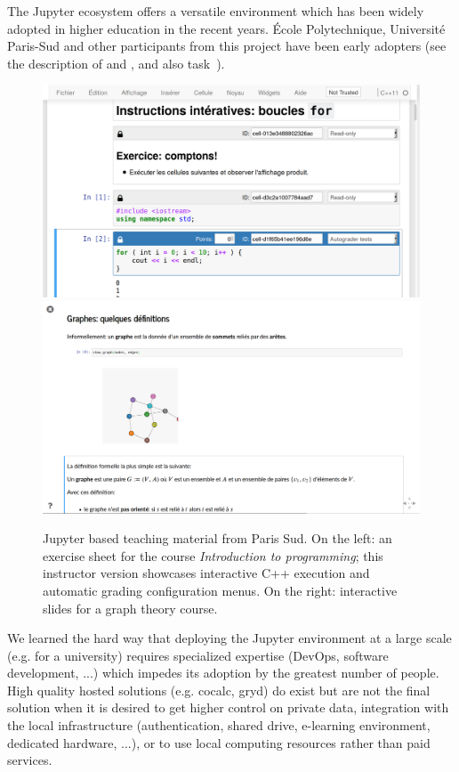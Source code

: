   The Jupyter
  ecosystem offers a versatile environment which has been widely
  adopted in higher education in the recent years. École
  Polytechnique, Université Paris-Sud and other participants from this
  project have been early adopters (see the description of 
  and , and also task~).

  \begin{figure}[ht!]\centering
  \includegraphics[width=.45\textwidth]{images/teaching-cling}\quad
  \includegraphics[width=.45\textwidth]{images/teaching-graphs}
  \caption{Jupyter based teaching material from Paris Sud. On the
    left: an exercise sheet for the course \emph{Introduction to
      programming}; this instructor version showcases interactive C++
    execution and automatic grading configuration menus. On the right:
    interactive slides for a graph theory course.}\label{fig:teaching-cling}
  \end{figure}

  We learned the hard way that deploying the Jupyter environment at a
  large scale (e.g. for a university) requires specialized expertise
  (DevOps, software development, ...) which impedes its adoption
  by the greatest number of people. High quality hosted solutions
  (e.g. cocalc, gryd) do exist but are not the final solution when it
  is desired to get higher control on private data, integration with
  the local infrastructure (authentication, shared drive, e-learning
  environment, dedicated hardware, ...), or to use local computing
  resources rather than paid services.

